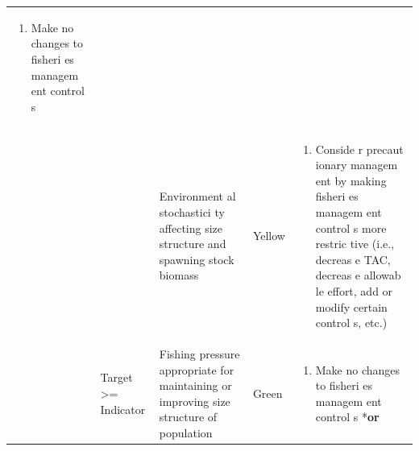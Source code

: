 \documentclass[]{book}
\providecommand{\tightlist}{%
  \setlength{\itemsep}{0pt}\setlength{\parskip}{0pt}}
\begin{document}
\begin{longtable}[]{@{}lllll@{}}
\begin{minipage}[t]{0.19\columnwidth}
\begin{enumerate}
\tightlist
\item
  Make no changes to fisheri es managem ent control s
\end{enumerate}\strut
\end{minipage}\tabularnewline
\begin{minipage}[t]{0.19\columnwidth}\raggedright\strut
\strut
\end{minipage} & \begin{minipage}[t]{0.19\columnwidth}\raggedright\strut
\strut
\end{minipage} & \begin{minipage}[t]{0.19\columnwidth}\raggedright\strut
Environment al stochastici ty affecting size structure and spawning
stock biomass\strut
\end{minipage} & \begin{minipage}[t]{0.19\columnwidth}\raggedright\strut
Yellow\strut
\end{minipage} & \begin{minipage}[t]{0.19\columnwidth}\raggedright\strut
\begin{enumerate}
\def\labelenumi{\arabic{enumi}.}
\tightlist
\item
  Conside r precaut ionary managem ent by making fisheri es managem ent
  control s more restric tive (i.e., decreas e TAC, decreas e allowab le
  effort, add or modify certain control s, etc.)
\end{enumerate}\strut
\end{minipage}\tabularnewline
\begin{minipage}[t]{0.19\columnwidth}\raggedright\strut
\strut
\end{minipage} & \begin{minipage}[t]{0.19\columnwidth}\raggedright\strut
Target \textgreater{}= Indicator\strut
\end{minipage} & \begin{minipage}[t]{0.19\columnwidth}\raggedright\strut
Fishing pressure appropriate for maintaining or improving size structure
of population\strut
\end{minipage} & \begin{minipage}[t]{0.19\columnwidth}\raggedright\strut
Green\strut
\end{minipage} & \begin{minipage}[t]{0.19\columnwidth}\raggedright\strut
\begin{enumerate}
\def\labelenumi{\arabic{enumi}.}
\tightlist
\item
  Make no changes to fisheri es managem ent control s *\textbf{or}
\end{enumerate}


\end{minipage}
\end{longtable}
\end{document}
